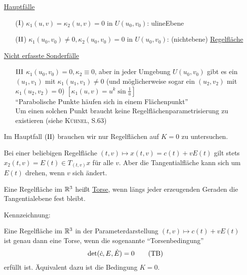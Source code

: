 \uline{Hauptfälle}
\begin{enumerate}
 \item[{\color{green}(\(\Rom1\))}] \(\kappa_1(u,v) = \kappa_2(u,v) = 0\) in \(U(u_0, v_0)\): uline{Ebene}
 \item[{\color{green}(\(\Rom2\))}] \(\kappa_1(u_0, v_0) \ne 0, \kappa_2(u_0, v_0) = 0\) in \(U(u_0, v_0)\): (nichtebene) \uline{Regelfläche}
\end{enumerate}

\uline{Nicht erfasste Sonderfälle}
\begin{enumerate}
 \item[{\color{magenta}\(\Rom3\)}] \(\kappa_1 (u_0, v_0) = 0, \kappa_2 \equiv 0\), aber in jeder Umgebung \(U(u_0, v_0)\) gibt es ein \((u_1, v_1)\) mit \(\kappa_1(u_1, v_1) \ne 0\) (und möglicherweise sogar ein \((u_2, v_2)\) mit \(\kappa_1(u_2, v_2) = 0\)) \(\left[\kappa_1 (u, v) = u^k \sin \frac{1}{u}\right]\) \\
"`Parabolische Punkte häufen sich in einem Flächenpunkt"' \\
 Um einen solchen Punkt braucht keine Regelflächenparametrisierung zu existieren (siehe \textsc{Kühnel}, S.63)
\end{enumerate}
Im Hauptfall \((\Rom2)\) brauchen wir nur Regelflächen auf \(K = 0\) zu untersuchen. \par
Bei einer beliebigen Regelfläche \((t,v) \mapsto x(t,v) = c(t) + v E(t)\) gilt stets \(x_2 (t,v) = E(t) \in T_{(t,v)}x\) für alle \(v\). Aber die Tangentialfläche kann sich um \(E(t)\) drehen, wenn \(v\) sich ändert.

\begin{definition}
 Eine Regelfläche im \(\mathbb{R}^3\) heißt \uline{Torse}, wenn längs jeder erzeugenden Geraden die Tangentialebene fest bleibt.
\end{definition}

Kennzeichnung:

\begin{satz}\label{satz263}
 Eine Regelfläche im \(\mathbb{R}^3\) in der Parameterdarstellung \((t,v) \mapsto c(t) + v E(t)\) ist genau dann eine Torse, wenn die sogenannte "`Torsenbedingung"'
 \Links
 \begin{align*}
  \det(\dot c, E, \dot E) = 0 \tag{\text{TB}}
 \end{align*}
 erfüllt ist. Äquivalent dazu ist die Bedingung \(K = 0\).
\end{satz}


